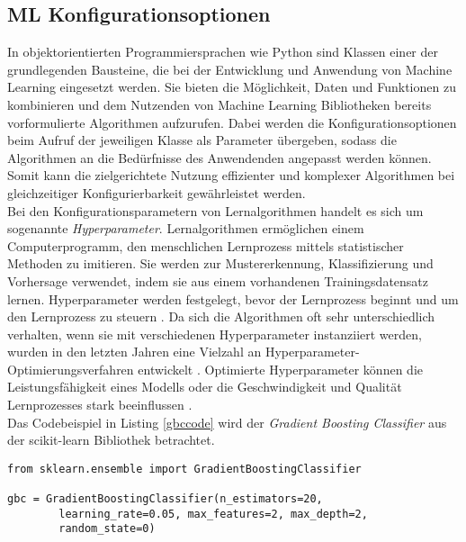 \documentclass[german,bachelor]{swsLeipzig}
\begin{document}
\subsection{ML Konfigurationsoptionen} \label{ML Konfigurationsoptionen}
In objektorientierten Programmiersprachen wie Python sind Klassen einer der grundlegenden Bausteine, die bei der Entwicklung und Anwendung
von Machine Learning eingesetzt werden.
Sie bieten die Möglichkeit, Daten und Funktionen zu kombinieren und dem Nutzenden von Machine Learning Bibliotheken
bereits vorformulierte Algorithmen aufzurufen.
Dabei werden die Konfigurationsoptionen beim Aufruf der jeweiligen Klasse als Parameter übergeben, sodass die Algorithmen
an die Bedürfnisse des Anwendenden angepasst werden können.
Somit kann die zielgerichtete Nutzung effizienter und komplexer Algorithmen bei gleichzeitiger Konfigurierbarkeit gewährleistet werden. \\
\indent Bei den Konfigurationsparametern von Lernalgorithmen handelt es sich um sogenannte \textit{Hyperparameter}.
Lernalgorithmen ermöglichen einem Computerprogramm, den menschlichen Lernprozess mittels statistischer Methoden zu imitieren.
Sie werden zur Mustererkennung, Klassifizierung und Vorhersage verwendet, indem sie aus einem vorhandenen Trainingsdatensatz
lernen.
Hyperparameter werden festgelegt, bevor der Lernprozess beginnt und um den Lernprozess zu steuern \cite[]{hype}.
Da sich die Algorithmen oft sehr unterschiedlich verhalten, wenn sie mit verschiedenen Hyperparameter instanziiert werden,
wurden in den letzten Jahren eine Vielzahl an Hyperparameter-Optimierungsverfahren entwickelt \cite[]{pmlr-v32-hutter14}.
Optimierte Hyperparameter können die Leistungsfähigkeit eines Modells oder die Geschwindigkeit und Qualität Lernprozesses stark beeinflussen \cite[]{hype}.\\
\indent Das Codebeispiel in Listing \ref{gbccode} wird der \textit{Gradient Boosting Classifier} aus der scikit-learn Bibliothek betrachtet.\\

\noindent\begin{minipage}{\linewidth}
\begin{lstlisting}[language=iPython, frame=single, label=gbccode, basicstyle=\small, caption={Nutzung der GradientBoostingClassifier-Klasse aus scikit-learn},captionpos=b]
from sklearn.ensemble import GradientBoostingClassifier

gbc = GradientBoostingClassifier(n_estimators=20,
        learning_rate=0.05, max_features=2, max_depth=2,
        random_state=0)
\end{lstlisting}
\end{minipage}
\
\end{document}
